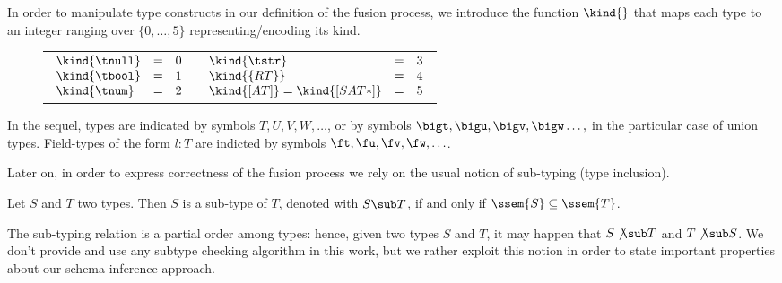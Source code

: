



\medskip

In order to manipulate type constructs in our definition of  the fusion process,  we introduce the function $\kind{}$ that maps each type to an integer ranging over $\{0,\ldots, 5\}$ representing/encoding its kind. 

\begin{figure}[ht]
\centering
\begin{tabular}{cc}
$\begin{array}{*{3}{l}}
\kind{\tnull} & = & 0 \\
\kind{\tbool} &= & 1 \\
\kind{\tnum} &= & 2 \\
\end{array}$
&
$\begin{array}{*{3}{l}}
\kind{\tstr} & = & 3 \\
\kind{\{RT\}} & = & 4 \\
\kind{[AT]} = \kind{[SAT*]} &= & 5\\
\end{array}$
\end{tabular}
\end{figure}

In the sequel, types are indicated  by symbols $T, U, V, W, \ldots$, or  by symbols $\bigt, \bigu, \bigv, \bigw \ldots,$ in the particular case of union types. Field-types of the form $l:T$ are indicted by symbols  $\ft, \fu, \fv, \fw, \ldots$.

\medskip

Later on, in order to express correctness of the fusion process we rely on the usual  notion of sub-typing (type inclusion). 


\begin{definition}\label{ref:label}
Let $S$ and $T$ two types. Then $S$ is a sub-type of $T$, denoted with $S \sub T$, if and only if $\ssem{S} \subseteq \ssem{T}$.
\end{definition}

The sub-typing relation is a partial order among types: hence, given two types $S$ and $T$, it may happen that $S \not\sub T$ and $T \not\sub S$. We don't provide and use any subtype checking algorithm  in this work, but we rather exploit this notion in order to state important properties about our schema inference approach. 




